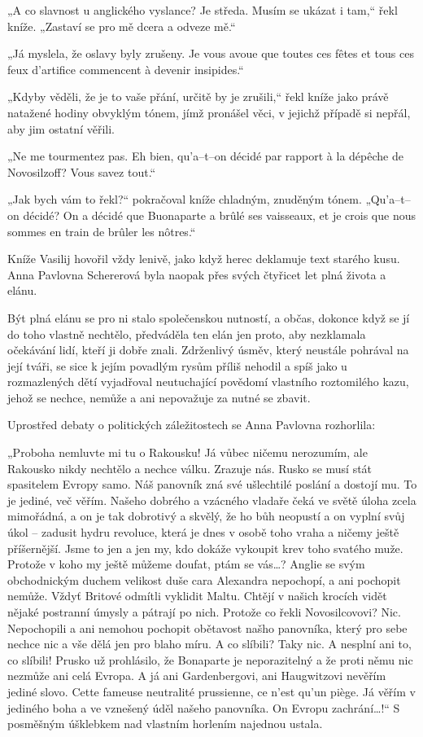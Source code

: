 „A co slavnost u anglického vyslance? Je středa. Musím se ukázat i tam,“ řekl kníže. „Zastaví se pro mě dcera a odveze mě.“

„Já myslela, že oslavy byly zrušeny. Je vous avoue que toutes ces fêtes et tous ces feux d'artifice commencent à devenir insipides.“

„Kdyby věděli, že je to vaše přání, určitě by je zrušili,“ řekl kníže jako právě natažené hodiny obvyklým tónem, jímž pronášel věci, v jejichž případě si nepřál, aby jim ostatní věřili.

„Ne me tourmentez pas. Eh bien, qu'a–t–on décidé par rapport à la dépêche de Novosilzoff? Vous savez tout.“

„Jak bych vám to řekl?“ pokračoval kníže chladným, znuděným tónem. „Qu'a–t–on décidé? On a décidé que Buonaparte a brûlé ses vaisseaux, et je crois que nous sommes en train de brûler les nôtres.“  

Kníže Vasilij hovořil vždy lenivě, jako když herec deklamuje text starého kusu. Anna Pavlovna Schererová byla naopak přes svých čtyřicet let plná života a elánu.

Být plná elánu se pro ni stalo společenskou nutností, a občas, dokonce když se jí do toho vlastně nechtělo, předváděla ten elán jen proto, aby nezklamala očekávání lidí, kteří ji dobře znali. Zdrženlivý úsměv, který neustále pohrával na její tváři, se sice k jejím povadlým rysům příliš nehodil a spíš jako u rozmazlených dětí vyjadřoval neutuchající povědomí vlastního roztomilého kazu, jehož se nechce, nemůže a ani nepovažuje za nutné se zbavit.

Uprostřed debaty o politických záležitostech se Anna Pavlovna rozhorlila:

„Proboha nemluvte mi tu o Rakousku! Já vůbec ničemu nerozumím, ale Rakousko nikdy nechtělo a nechce válku. Zrazuje nás. Rusko se musí stát spasitelem Evropy samo. Náš panovník zná své ušlechtilé poslání a dostojí mu. To je jediné, več věřím. Našeho dobrého a vzácného vladaře čeká ve světě úloha zcela mimořádná, a on je tak dobrotivý a skvělý, že ho bůh neopustí a on vyplní svůj úkol – zadusit hydru revoluce, která je dnes v osobě toho vraha a ničemy ještě příšernější. Jsme to jen a jen my, kdo dokáže vykoupit krev toho svatého muže. Protože v koho my ještě můžeme doufat, ptám se vás…? Anglie se svým obchodnickým duchem velikost duše cara Alexandra nepochopí, a ani pochopit nemůže. Vždyť Britové odmítli vyklidit Maltu. Chtějí v našich krocích vidět nějaké postranní úmysly a pátrají po nich. Protože co řekli Novosilcovovi? Nic. Nepochopili a ani nemohou pochopit obětavost našho panovníka, který pro sebe nechce nic a vše dělá jen pro blaho míru. A co slíbili? Taky nic. A nesplní ani to, co slíbili! Prusko už prohlásilo, že Bonaparte je neporazitelný a že proti němu nic nezmůže ani celá Evropa. A já ani Gardenbergovi, ani Haugwitzovi nevěřím jediné slovo. Cette fameuse neutralité prussienne, ce n'est qu'un piège. Já věřím v jediného boha a ve vznešený úděl našeho panovníka. On Evropu zachrání…!“ S posměšným úšklebkem nad vlastním horlením najednou ustala.

